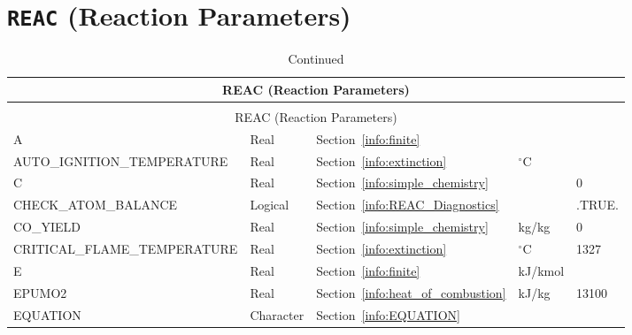 \documentclass[11pt]{book}
\begin{document}
\vspace{\baselineskip}

\newpage
\section{\texorpdfstring{{\tt REAC}}{REAC} (Reaction Parameters)}

\begin{longtable}{@{\extracolsep{\fill}}|l|l|l|l|l|}
\caption[Reaction parameters ({\ct REAC} namelist group)]{For more information see Chapter~\ref{chap:combustion}.}
\label{tbl:REAC} \\
\hline
\multicolumn{5}{|c|}{{\ct REAC} (Reaction Parameters)} \\
\hline \hline
\endfirsthead
\caption[]{Continued} \\
\hline
\multicolumn{5}{|c|}{{\ct REAC} (Reaction Parameters)} \\
\hline \hline
\endhead
{\ct A}                                   & Real        & Section~\ref{info:finite}                 &                   &     \\ \hline
{\ct AUTO\_IGNITION\_TEMPERATURE}         & Real        & Section~\ref{info:extinction}             & $^\circ$C         &     \\ \hline
{\ct C}                                   & Real        & Section~\ref{info:simple_chemistry}       &                   & 0    \\ \hline
{\ct CHECK\_ATOM\_BALANCE}                & Logical     & Section~\ref{info:REAC_Diagnostics}       &                   & {\ct .TRUE.}    \\ \hline
{\ct CO\_YIELD}                           & Real        & Section~\ref{info:simple_chemistry}       & kg/kg             & 0        \\ \hline
{\ct CRITICAL\_FLAME\_TEMPERATURE}        & Real        & Section~\ref{info:extinction}             &   $^\circ$C       & 1327    \\ \hline
{\ct E}                                   & Real        & Section~\ref{info:finite}                 &   kJ/kmol         &     \\ \hline
{\ct EPUMO2}                              & Real        & Section~\ref{info:heat_of_combustion}     &   kJ/kg           & 13100    \\ \hline
{\ct EQUATION}                            & Character   & Section~\ref{info:EQUATION}               &                   &          \\ \hline

\end{longtable}
\end{document}
